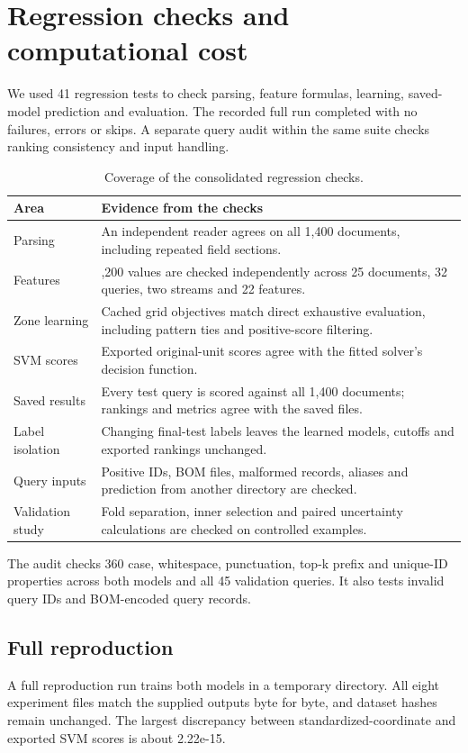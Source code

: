 \documentclass[12pt,a4paper]{article}
\begin{document}
\section{Regression checks and computational cost}
We used 41 regression tests to check parsing, feature formulas, learning, saved-model prediction and evaluation. The recorded full run completed with no failures, errors or skips. A separate query audit within the same suite checks ranking consistency and input handling.

\begin{table}[htbp]\centering\small
\caption{Coverage of the consolidated regression checks.}
\begin{tabularx}{\linewidth}{>{\raggedright\arraybackslash}X>{\raggedright\arraybackslash}X}
\toprule
\textbf{Area} & \textbf{Evidence from the checks} \\\midrule
Parsing & An independent reader agrees on all 1,400 documents, including repeated field sections. \\
Features & 35,200 values are checked independently across 25 documents, 32 queries, two streams and 22 features. \\
Zone learning & Cached grid objectives match direct exhaustive evaluation, including pattern ties and positive-score filtering. \\
SVM scores & Exported original-unit scores agree with the fitted solver's decision function. \\
Saved results & Every test query is scored against all 1,400 documents; rankings and metrics agree with the saved files. \\
Label isolation & Changing final-test labels leaves the learned models, cutoffs and exported rankings unchanged. \\
Query inputs & Positive IDs, BOM files, malformed records, aliases and prediction from another directory are checked. \\
Validation study & Fold separation, inner selection and paired uncertainty calculations are checked on controlled examples. \\
\bottomrule\end{tabularx}\end{table}
The audit checks 360 case, whitespace, punctuation, top-k prefix and unique-ID properties across both models and all 45 validation queries. It also tests invalid query IDs and BOM-encoded query records.

\subsection{Full reproduction}
A full reproduction run trains both models in a temporary directory. All eight experiment files match the supplied outputs byte for byte, and dataset hashes remain unchanged. The largest discrepancy between standardized-coordinate and exported SVM scores is about 2.22e-15.
\end{document}
